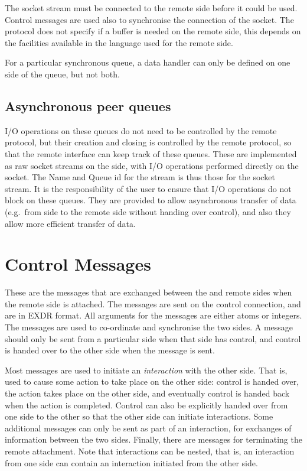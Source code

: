 The socket stream must be connected to the remote side before it could be
used. Control messages are used also to synchronise the connection of
the socket. The protocol does not specify if a buffer is needed on the
remote side, this depends on the facilities available in the language used
for the remote side.

For a particular synchronous queue, a data handler can only be defined on
one side of the queue, but not both.
 
\subsection{Asynchronous peer queues}

I/O operations on these queues do not need to be controlled by the remote
protocol, but their creation and closing is controlled by the remote
protocol, so that the remote interface can keep track of these queues.
These are implemented as raw socket streams on the {\eclipse}
side, with I/O operations performed directly on the socket. The Name and
Queue id for the stream is thus those for the {\eclipse} socket stream. It
is the responsibility of the user to ensure that I/O operations do not
block on these queues. They are provided to allow asynchronous transfer of
data (e.g.\ from {\eclipse} side to the remote side without handing over
control), and also they allow more efficient transfer of data.  

\section{Control Messages}

These are the messages that are exchanged between the {\eclipse} and remote
sides when the remote side is attached. The messages are sent on the
control connection, and are in EXDR format. All arguments for the messages
are either atoms or integers. The messages are used to
co-ordinate and synchronise the two sides. A message should only be sent from a
particular side when that side has control, and control is handed over
to the other side when the message is sent. 

Most messages are used to initiate an {\it interaction\/} with the
other side. That is, used to cause some action to take place on the
other side: control is handed over, the action takes place on the other
side, and eventually control is handed back 
when the action is completed. Control can also be explicitly handed over
from one side to the other so that the other side can initiate
interactions. Some additional messages can only be sent as part of an
interaction, for exchanges of information between the two sides. Finally,
there are messages for terminating the remote attachment. Note that
interactions can be nested, that is, an interaction from one side can
contain an interaction initiated from the other side. 

